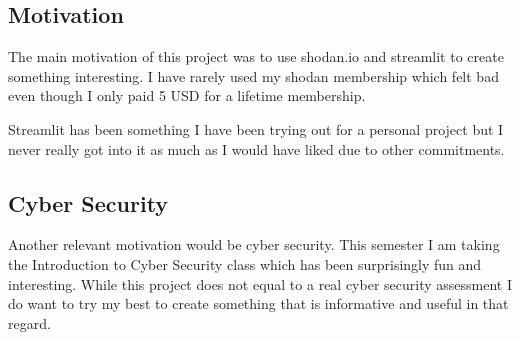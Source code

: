 \documentclass[11pt,a4paper]{article}
\begin{document}
\begin{motivation}
\section{Motivation}
The main motivation of this project was to use shodan.io and streamlit to create something interesting. I have rarely used
my shodan membership which felt bad even though I only paid 5 USD for a lifetime membership.

Streamlit has been something I have been trying out for a personal project but I never really got into it as much as I
would have liked due to other commitments.

\subsection{Cyber Security}
Another relevant motivation would be cyber security. This semester I am taking the Introduction to Cyber Security class
which has been surprisingly fun and interesting. While this project does not equal to a real cyber security assessment I
do want to try my best to create something that is informative and useful in that regard.

\end{motivation}
\newpage
\end{document}
